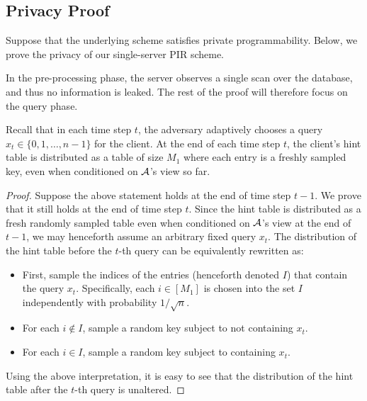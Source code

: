 \subsection{Privacy Proof}
\label{sec:1server-priv}

Suppose that the underlying \ppps scheme satisfies
private programmability.
Below, we prove the privacy of our single-server PIR scheme.

In the pre-processing 
phase, the server observes a single scan over the database,
and thus no information is leaked.
The rest of the proof will therefore
focus on the query phase.

\begin{lemma}\label{lem:hintone}
Recall that in each time step $t$, the adversary \algA 
adaptively chooses a query $x_t \in \{0, 1, \ldots, n-1\}$ for the client.
At the end of each time step $t$, 
the client's hint table  
is distributed 
as a table of size $M_1$
where each entry is a freshly sampled \ppps key, even when
conditioned on $\mathcal{A}$'s view so far.  
\label{lem:hintfresh}
\end{lemma}
\begin{proof}
Suppose the above statement holds at the end of time step $t-1$.
We prove that it still holds 
at the end of time step $t$.
Since the hint table is distributed as a fresh randomly sampled
table even when conditioned on $\mathcal{A}$'s view
at the end of $t-1$, we may henceforth assume
an arbitrary fixed query $x_t$.
The distribution of the hint table 
before the $t$-th query can be equivalently rewritten as:
\begin{itemize}[leftmargin=5mm]
\item 
First, sample the indices of the entries (henceforth denoted $I$)
that contain the query $x_t$. Specifically, each  
$i \in [M_1]$ is chosen into the set $I$ 
independently with probability $1/\sqrt{n}$.
\item 
For each $i \notin I$, sample a random \ppps
key subject to not containing $x_t$.
\item 
For each $i \in I$, sample a random \ppps
key subject to containing $x_t$.
\end{itemize}

Using the above interpretation, it is easy to see 
that the distribution of the hint table 
after the $t$-th query is unaltered.
\end{proof}


